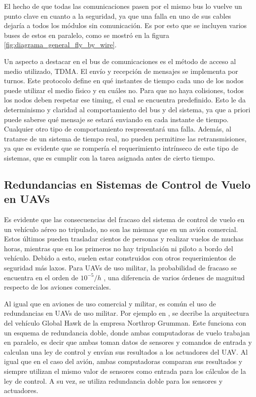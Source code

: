 El hecho de que todas las comunicaciones pasen por el mismo bus lo vuelve un punto clave en cuanto a la seguridad, ya que una falla en uno de sus cables dejaría a todos los módulos sin comunicación. Es por esto que se incluyen varios buses de estos en paralelo, como se mostró en la figura \ref{fig:diagrama_general_fly_by_wire}.

Un aspecto a destacar en el bus de comunicaciones es el método de acceso al medio utilizado, TDMA. El envío y recepción de mensajes se implementa por turnos. Este protocolo define en qué instantes de tiempo cada uno de los nodos puede utilizar el medio físico y en cuáles no. Para que no haya colisiones, todos los nodos deben respetar ese timing, el cual se encuentra predefinido. Esto le da determinismo y claridad al comportamiento del bus y del sistema, ya que a priori puede saberse qué mensaje se estará enviando en cada instante de tiempo. Cualquier otro tipo de comportamiento respresentará una falla. Además, al tratarse de un sistema de tiempo real, no pueden permitirse las retransmisiones, ya que es evidente que se rompería el requerimiento intrínseco de este tipo de sistemas, que es cumplir con la tarea asignada antes de cierto tiempo.



\subsection{Redundancias en Sistemas de Control de Vuelo en UAVs}

Es evidente que las consecuencias del fracaso del sistema de control de vuelo en un vehículo aéreo no tripulado, no son las mismas que en un avión comercial. Estos últimos pueden trasladar cientos de personas y realizar vuelos de muchas horas, mientras que en los primeros no hay tripulación ni piloto a bordo del vehículo. Debido a esto, suelen estar construidos con otros requerimientos de seguridad más laxos. Para UAVs de uso militar, la probabilidad de fracaso se encuentra en el orden de $10^{-5} / h$ \cite{zhang2020architecture}\cite[p.~491]{collinson2023introduction}, una diferencia de varios órdenes de magnitud respecto de los aviones comerciales.

Al igual que en aviones de uso comercial y militar, es común el uso de redundancias en UAVs de uso militar. Por ejemplo en \cite{821966}, se decribe la arquitectura del vehículo Global Hawk de la empresa Northrop Grumman. Este funciona con un esquema de redundancia doble, donde ambas computadoras de vuelo trabajan en paralelo, es decir que ambas toman datos de sensores y comandos de entrada y calculan una ley de control y envían sus resultados a los actuadores del UAV. Al igual que en el caso del avión, ambas computadoras comparan sus resultados y siempre utilizan el mismo valor de sensores como entrada para los cálculos de la ley de control. A su vez, se utiliza redundancia doble para los sensores y actuadores.

